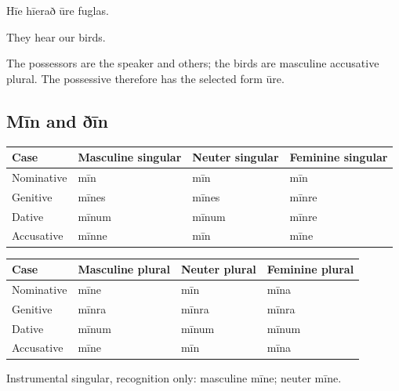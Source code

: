 Hīe hīerað ūre fuglas.

They hear our birds.

The possessors are the speaker and others; the birds are masculine accusative plural. The possessive therefore has the selected form ūre.

\subsection*{Mīn and ðīn}

\par\begingroup
\fontsize{10.5}{13.2}\selectfont
\setlength{\LTleft}{0pt}\setlength{\LTright}{\fill}
\noindent
\begin{tabular}{@{}>{\raggedright\arraybackslash}p{22.0mm}>{\raggedright\arraybackslash}p{31.188mm}>{\raggedright\arraybackslash}p{31.188mm}>{\raggedright\arraybackslash}p{31.188mm}@{}}
\toprule
\textbf{Case} & \textbf{Masculine singular} & \textbf{Neuter singular} & \textbf{Feminine singular} \\
\midrule
Nominative & mīn & mīn & mīn \\
Genitive & mīnes & mīnes & mīnre \\
Dative & mīnum & mīnum & mīnre \\
Accusative & mīnne & mīn & mīne \\
\bottomrule
\end{tabular}
\par\endgroup
\par\addvspace{5pt}
\par\begingroup
\fontsize{10.5}{13.2}\selectfont
\setlength{\LTleft}{0pt}\setlength{\LTright}{\fill}
\noindent
\begin{tabular}{@{}>{\raggedright\arraybackslash}p{22.0mm}>{\raggedright\arraybackslash}p{31.188mm}>{\raggedright\arraybackslash}p{31.188mm}>{\raggedright\arraybackslash}p{31.188mm}@{}}
\toprule
\textbf{Case} & \textbf{Masculine plural} & \textbf{Neuter plural} & \textbf{Feminine plural} \\
\midrule
Nominative & mīne & mīn & mīna \\
Genitive & mīnra & mīnra & mīnra \\
Dative & mīnum & mīnum & mīnum \\
Accusative & mīne & mīn & mīna \\
\bottomrule
\end{tabular}
\par\endgroup
Instrumental singular, recognition only: masculine mīne; neuter mīne.

